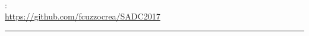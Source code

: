 \thispagestyle{empty}

\hfill
\vspace{5cm}
\strong{ }\\

\vfill

\begin{multicols}{2}
\medskip
{}: \\
\url{https://github.com/fcuzzocrea/SADC2017}

\end{multicols}
\vspace{1cm}
\hrule
\bigskip
\clearpage
